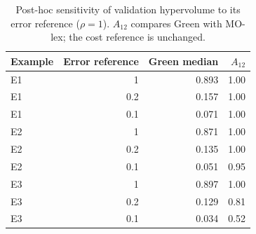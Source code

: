 \begin{table}[!htbp]\centering
\caption{Post-hoc sensitivity of validation hypervolume to its error reference ($\rho=1$). $A_{12}$ compares Green with MO-lex; the cost reference is unchanged.}
\label{tab:hv_reference}
\begin{tabular}{lrrr}\toprule
Example & Error reference & Green median & $A_{12}$ \\ \midrule
E1 & 1 & 0.893 & 1.00 \\
E1 & 0.2 & 0.157 & 1.00 \\
E1 & 0.1 & 0.071 & 1.00 \\
E2 & 1 & 0.871 & 1.00 \\
E2 & 0.2 & 0.135 & 1.00 \\
E2 & 0.1 & 0.051 & 0.95 \\
E3 & 1 & 0.897 & 1.00 \\
E3 & 0.2 & 0.129 & 0.81 \\
E3 & 0.1 & 0.034 & 0.52 \\
\bottomrule\end{tabular}\end{table}
